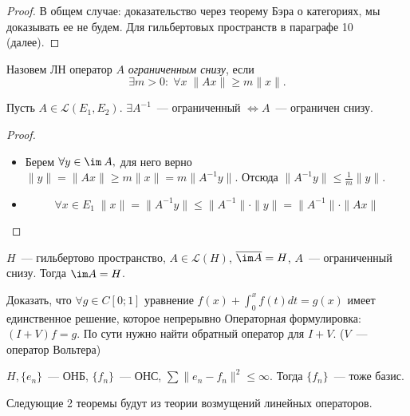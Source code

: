 \begin{proof}
    В общем случае: доказательство через теорему Бэра о категориях, мы доказывать ее не будем.
    Для гильбертовых пространств в параграфе 10 (далее).
\end{proof}

\begin{definition}[Усиление условия $\ker A = \{0\}$]
    Назовем ЛН оператор $A$ \textit{ограниченным снизу}, если
    \[\exists m > 0:\; \forall x \; \|Ax\| \geqslant m \|x\|.\]
\end{definition}

\begin{theorem}[8.1]\label{8.1}
    Пусть $A \in \mathcal{L}(E_1, E_2)$. $\exists A^{-1}$~--- ограниченный $\Leftrightarrow A$~--- ограничен снизу.
\end{theorem}
\begin{proof}
    \begin{itemize}
        \item[$\Leftarrow$]
        Берем $\forall y \in \im\: A,$ для него верно \(\|y\| = \|Ax\| \geqslant m \|x\| = m \|A^{-1}y\|.\)
        Отсюда $\|A^{-1} y\| \leqslant \frac{1}{m} \|y\|$.
        \item[$\Rightarrow$]
        \[ \forall x \in E_1 \; \|x\|=\|A^{-1} y\| \leqslant \| A^{-1}\| \cdot \|y\|=\|A^{-1}\| \cdot \|Ax\| \]
    \end{itemize}
\end{proof}

\begin{exercise}
    $H$~--- гильбертово пространство, $A \in \mathcal{L}(H)$, 
    $\overline{\im A} = H$, $A$~--- ограниченный снизу. Тогда $\im A = H$.
\end{exercise}

\begin{example}
    Доказать, что $\forall g \in C[0;1]$ уравнение $f(x)+\int_0^x f(t)dt=g(x)$ имеет единственное решение, которое непрерывно
    Операторная формулировка: $(I + V)f = g$. По сути нужно найти обратный оператор для $I + V$. ($V$~--- оператор Вольтера)
\end{example}

\begin{example}
    $H, \{e_n\}$~--- ОНБ, $\{f_n\}$~--- ОНС, $\sum \|e_n - f_n\|^2 \le \infty.$ Тогда $\{f_n\}$~--- тоже базис.
\end{example}

Следующие 2 теоремы будут из теории возмущений линейных операторов.

